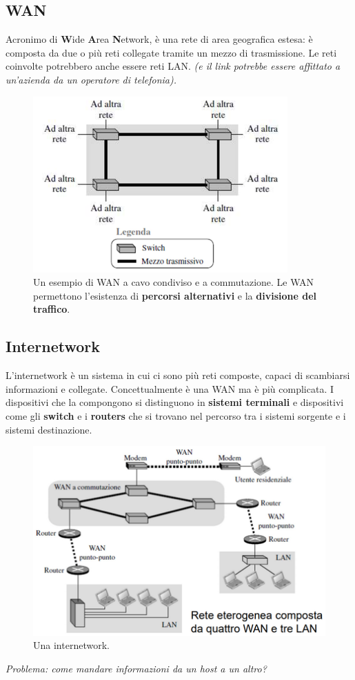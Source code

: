 \documentclass[11pt,a4paper]{article}
\theoremstyle{definition}
\begin{document}
\subsection{WAN}
Acronimo di \textbf{W}ide \textbf{A}rea \textbf{N}etwork, è una rete di area geografica estesa: è composta da due o più reti collegate tramite un mezzo di trasmissione. Le reti coinvolte potrebbero anche essere reti LAN. \textit{(e il link potrebbe essere affittato a un'azienda da un operatore di telefonia).}
\begin{figure}[!h]
	\includegraphics[scale=0.6]{Immagini/WAN_Switch.png}
	\centering
	\caption{Un esempio di WAN a cavo condiviso e a commutazione.\newline
		Le WAN permettono l'esistenza di \textbf{percorsi alternativi} e la \textbf{divisione del traffico}.}
\end{figure}


\subsection{Internetwork}
L'internetwork è un sistema in cui ci sono più reti composte, capaci di scambiarsi informazioni e collegate. Concettualmente è una WAN ma è più complicata.\newline
I dispositivi che la compongono si distinguono in \textbf{sistemi terminali}
e dispositivi come gli \textbf{switch} e i \textbf{routers} che si trovano nel percorso tra i sistemi sorgente e i sistemi destinazione.
\begin{figure}[!h]
	\includegraphics[scale=0.4]{Immagini/Internetwork.png}
	\centering
	\caption{Una internetwork.}
\end{figure}\newline
\textit{Problema: come mandare informazioni da un host a un altro?}
\newpage
\end{document}
